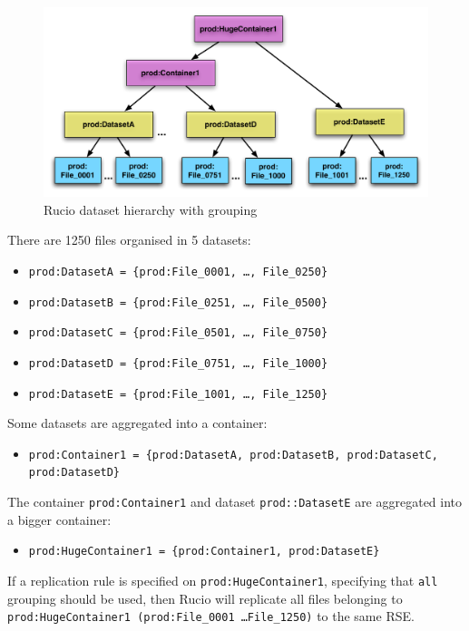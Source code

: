 \documentclass{atlasnote}
\begin{document}
\begin{figure}[ht]
\begin{center}
\includegraphics[width=400pt]{dataset_hierarchy}
\end{center}
\caption{\label{datasethierarchy} Rucio dataset hierarchy with grouping}
\end{figure}

There are 1250 files organised in 5 datasets:
\begin{itemize}
\item[] \texttt{prod:DatasetA = \{prod:File\_0001, \ldots, File\_0250\}}
\item[] \texttt{prod:DatasetB = \{prod:File\_0251, \ldots, File\_0500\}}
\item[] \texttt{prod:DatasetC = \{prod:File\_0501, \ldots, File\_0750\}}
\item[] \texttt{prod:DatasetD = \{prod:File\_0751, \ldots, File\_1000\}}
\item[] \texttt{prod:DatasetE = \{prod:File\_1001, \ldots, File\_1250\}}
\end{itemize}

Some datasets are aggregated into a container:
\begin{itemize}
\item[] \texttt{prod:Container1 = \{prod:DatasetA, prod:DatasetB, prod:DatasetC, prod:DatasetD\}}
\end{itemize}

The container \texttt{prod:Container1} and dataset \texttt{prod::DatasetE} are aggregated into a bigger container:
\begin{itemize}
\item[] \texttt{prod:HugeContainer1 = \{prod:Container1, prod:DatasetE\}}
\end{itemize}

If a replication rule is specified on \texttt{prod:HugeContainer1}, specifying that \texttt{all} grouping should be used, then Rucio will replicate all files belonging to \texttt{prod:HugeContainer1 (prod:File\_0001 \dots File\_1250)} to the same RSE.
\end{document}
